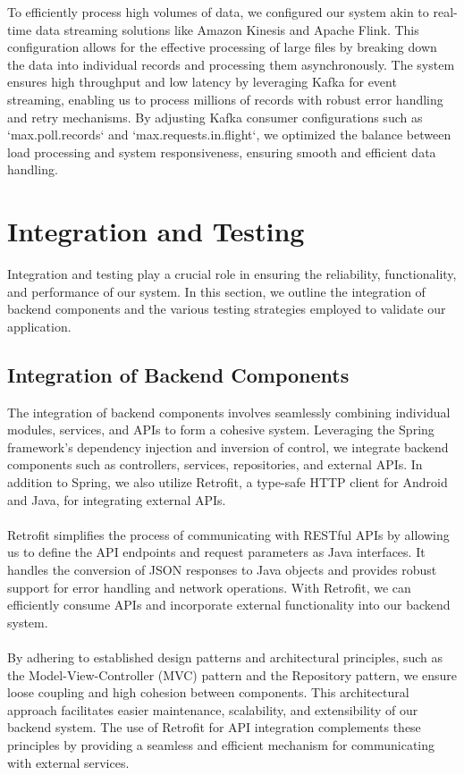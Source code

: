 \documentclass[12pt,a4paper]{report}
\begin{document}
To efficiently process high volumes of data, we configured our system akin to real-time data streaming solutions like Amazon Kinesis and Apache Flink. This configuration allows for the effective processing of large files by breaking down the data into individual records and processing them asynchronously. The system ensures high throughput and low latency by leveraging Kafka for event streaming, enabling us to process millions of records with robust error handling and retry mechanisms. By adjusting Kafka consumer configurations such as `max.poll.records` and `max.requests.in.flight`, we optimized the balance between load processing and system responsiveness, ensuring smooth and efficient data handling.

\section{Integration and Testing}

Integration and testing play a crucial role in ensuring the reliability, functionality, and performance of our system. In this section, we outline the integration of backend components and the various testing strategies employed to validate our application.

\subsection{Integration of Backend Components}

The integration of backend components involves seamlessly combining individual modules, services, and APIs to form a cohesive system. Leveraging the Spring framework's dependency injection and inversion of control, we integrate backend components such as controllers, services, repositories, and external APIs. In addition to Spring, we also utilize Retrofit, a type-safe HTTP client for Android and Java, for integrating external APIs.
\\\\
\noindent Retrofit simplifies the process of communicating with RESTful APIs by allowing us to define the API endpoints and request parameters as Java interfaces. It handles the conversion of JSON responses to Java objects and provides robust support for error handling and network operations. With Retrofit, we can efficiently consume APIs and incorporate external functionality into our backend system.
\\\\
\noindent By adhering to established design patterns and architectural principles, such as the Model-View-Controller (MVC) pattern and the Repository pattern, we ensure loose coupling and high cohesion between components. This architectural approach facilitates easier maintenance, scalability, and extensibility of our backend system. The use of Retrofit for API integration complements these principles by providing a seamless and efficient mechanism for communicating with external services.
\end{document}
